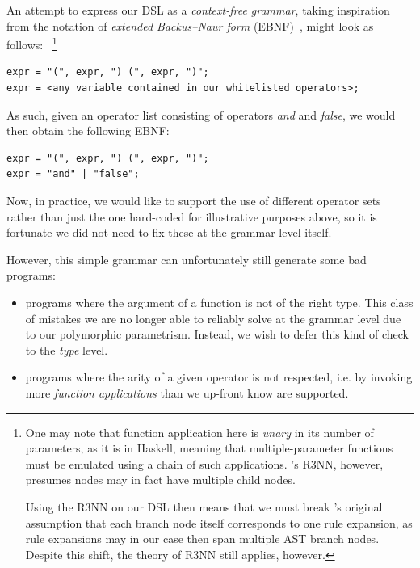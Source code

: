 \documentclass{article}
\begin{document}
An attempt to express our DSL
as a \emph{context-free grammar},
taking inspiration from the notation of \emph{extended Backus–Naur form} (EBNF)~\citep{standard1996ebnf},
might look as follows:
~\footnote{
    One may note that function application here is \emph{unary} in its number of parameters, as it is in Haskell,
    meaning that multiple-parameter functions must be emulated using a chain of such applications.
    \citet{nsps}'s R3NN, however, presumes nodes may in fact have multiple child nodes.

    Using the R3NN on our DSL then means that we must break \citet{nsps}'s original
    assumption that each branch node itself corresponds to one rule expansion,
    as rule expansions may in our case then span multiple AST branch nodes.
    Despite this shift, the theory of R3NN still applies, however.
}

\begin{verbatim}
expr = "(", expr, ") (", expr, ")";
expr = <any variable contained in our whitelisted operators>;
\end{verbatim}

As such, given an operator list consisting of operators \emph{and} and \emph{false},
we would then obtain the following EBNF:

\begin{verbatim}
expr = "(", expr, ") (", expr, ")";
expr = "and" | "false";
\end{verbatim}


Now, in practice, we would like to support the use of different operator sets
rather than just the one hard-coded for illustrative purposes above,
so it is fortunate we did not need to fix these at the grammar level itself.

However, this simple grammar can unfortunately still generate some bad programs:
\begin{itemize}
    \item programs where the argument of a function is not of the right type.
        This class of mistakes we are no longer able to reliably solve
        at the grammar level due to our polymorphic parametrism.
        Instead, we wish to defer this kind of check to the \emph{type} level.
    \item programs where the arity of a given operator is not respected, i.e.
        by invoking more \emph{function applications} than we up-front know are supported.
\end{itemize}
\end{document}
